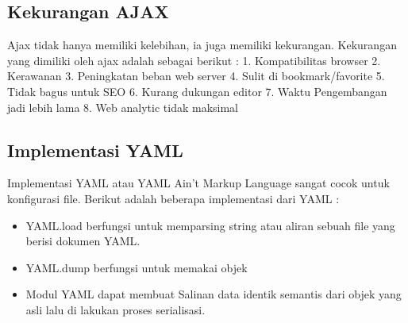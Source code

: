\subsection{Kekurangan AJAX}
Ajax tidak hanya memiliki kelebihan, ia juga memiliki kekurangan. Kekurangan yang dimiliki oleh ajax adalah sebagai berikut :
1.	Kompatibilitas browser
2.	Kerawanan
3.	Peningkatan beban web server
4.	Sulit di bookmark/favorite
5.	Tidak bagus untuk SEO
6.	Kurang dukungan editor
7.	Waktu Pengembangan jadi lebih lama
8.	Web analytic tidak maksimal

\subsection{Implementasi YAML}
Implementasi YAML atau YAML Ain’t Markup Language sangat cocok untuk konfigurasi file.
Berikut adalah beberapa implementasi dari YAML :
\begin{itemize}
\item YAML.load berfungsi untuk memparsing string atau aliran sebuah file yang berisi dokumen YAML.
\item YAML.dump berfungsi untuk memakai objek 
\item Modul YAML dapat membuat Salinan data identik semantis dari objek yang asli lalu di lakukan proses serialisasi.

\end{itemize}
